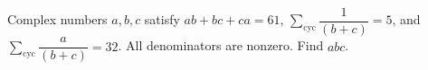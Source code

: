 Complex numbers $a,b,c$ satisfy $ab+bc+ca=61$, $\sum_{\mathrm{cyc}}\dfrac{1}{(b+c)}=5$, and $\sum_{\mathrm{cyc}}\dfrac{a}{(b+c)}=32$. All denominators are nonzero. Find $abc$.

